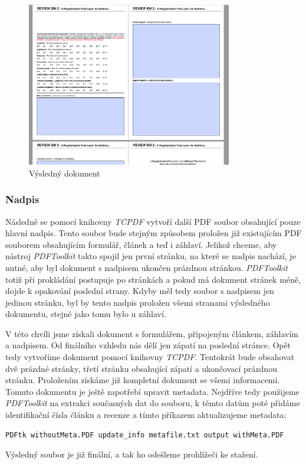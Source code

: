 \documentclass[czech,BP]{thesiskiv}
\begin{document}
\begin{figure}[h]
    \centering
    	\includegraphics[width=0.8\textwidth]{obr7.png}
    	\caption{Výsledný dokument}
    	\label{kombinace2}
\end{figure}
\subsubsection{Nadpis}
Následně se pomocí knihovny \emph{TCPDF} vytvoří další PDF soubor obsahující pouze hlavní nadpis. Tento soubor bude stejným způsobem proložen již existujícím PDF souborem obsahujícím formulář, článek a teď i záhlaví. Jelikož chceme, aby nástroj \emph{PDFToolkit} takto spojil jen první stránku, na které se nadpis nachází, je nutné, aby byl dokument s nadpisem ukončen prázdnou stránkou. \emph{PDFToolkit} totiž při prokládání postupuje po stránkách a pokud má dokument stránek méně, dojde k opakování poslední strany. Kdyby měl tedy soubor s nadpisem jen jedinou stránku, byl by tento nadpis proložen všemi stranami výsledného dokumentu, stejně jako tomu bylo u záhlaví. 

V této chvíli jsme získali dokument s formulářem, připojeným článkem, záhlavím a nadpisem. Od finálního vzhledu nás dělí jen zápatí na poslední stránce. Opět tedy vytvoříme dokument pomocí knihovny \emph{TCPDF}. Tentokrát bude obsahovat dvě prázdné stránky, třetí stránku obsahující zápatí a ukončovací prázdnou stránku. Proložením získáme již kompletní dokument se všemi informacemi. Tomuto dokumentu je ještě zapotřebí upravit metadata. Nejdříve tedy použijeme \emph{PDFToolkit} na extrakci současných dat do souboru, k těmto datům poté přidáme identifikační čísla článku a recenze a tímto příkazem aktualizujeme metadata: 
\begin{lstlisting}
PDFtk withoutMeta.PDF update_info metafile.txt output withMeta.PDF
\end{lstlisting}
Výsledný soubor je již finální, a tak ho odešleme prohlížeči ke stažení.
\end{document}
